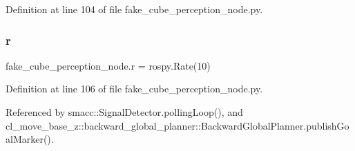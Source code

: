 Definition at line 104 of file fake\+\_\+cube\+\_\+perception\+\_\+node.\+py.

\mbox{\label{namespacefake__cube__perception__node_a36e88703ab69fd35065e8a8d9344903e}} 
\subsubsection{\texorpdfstring{r}{r}}
{\footnotesize\ttfamily fake\+\_\+cube\+\_\+perception\+\_\+node.\+r = rospy.\+Rate(10)}



Definition at line 106 of file fake\+\_\+cube\+\_\+perception\+\_\+node.\+py.



Referenced by smacc\+::\+Signal\+Detector.\+polling\+Loop(), and cl\+\_\+move\+\_\+base\+\_\+z\+::backward\+\_\+global\+\_\+planner\+::\+Backward\+Global\+Planner.\+publish\+Goal\+Marker().

